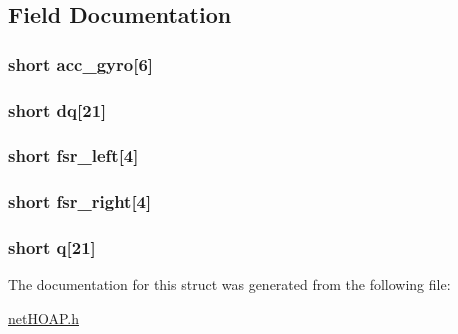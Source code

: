 \subsection{Field Documentation}
\hypertarget{struct_hoap_sensor_a384297bd2700be586666b28c6c89fad9}{
\subsubsection[{acc\-\_\-gyro}]{\setlength{\rightskip}{0pt plus 5cm}short acc\-\_\-gyro\mbox{[}6\mbox{]}}}\label{struct_hoap_sensor_a384297bd2700be586666b28c6c89fad9}
\hypertarget{struct_hoap_sensor_af35afccdff23028eafd9d98618889e5a}{
\subsubsection[{dq}]{\setlength{\rightskip}{0pt plus 5cm}short dq\mbox{[}21\mbox{]}}}\label{struct_hoap_sensor_af35afccdff23028eafd9d98618889e5a}
\hypertarget{struct_hoap_sensor_a4a53c736da995b3c5d2d55d0db4d6bf7}{
\subsubsection[{fsr\-\_\-left}]{\setlength{\rightskip}{0pt plus 5cm}short fsr\-\_\-left\mbox{[}4\mbox{]}}}\label{struct_hoap_sensor_a4a53c736da995b3c5d2d55d0db4d6bf7}
\hypertarget{struct_hoap_sensor_aa0f02e265b9e527d54facdaea6b2109d}{
\subsubsection[{fsr\-\_\-right}]{\setlength{\rightskip}{0pt plus 5cm}short fsr\-\_\-right\mbox{[}4\mbox{]}}}\label{struct_hoap_sensor_aa0f02e265b9e527d54facdaea6b2109d}
\hypertarget{struct_hoap_sensor_af901d9eeb7e1a1c873559735d52cf4ac}{
\subsubsection[{q}]{\setlength{\rightskip}{0pt plus 5cm}short q\mbox{[}21\mbox{]}}}\label{struct_hoap_sensor_af901d9eeb7e1a1c873559735d52cf4ac}


The documentation for this struct was generated from the following file\-:\begin{DoxyCompactItemize}
\item 
\hyperlink{net_h_o_a_p_8h}{net\-H\-O\-A\-P.\-h}\end{DoxyCompactItemize}
